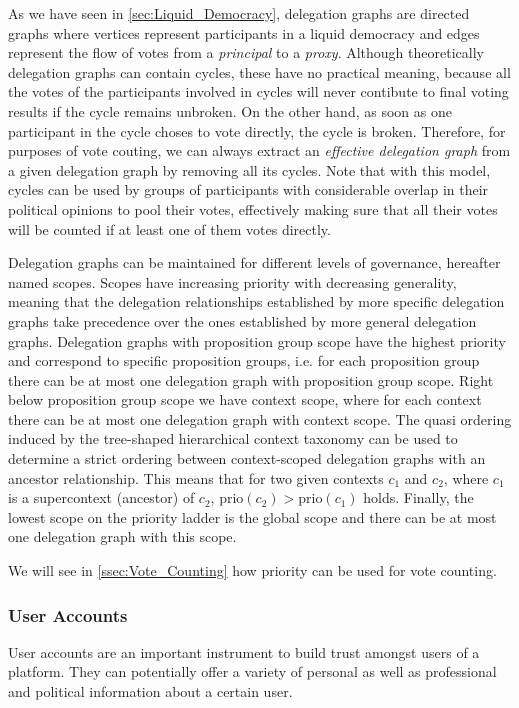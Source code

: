 As we have seen in \ref{sec:Liquid_Democracy}, delegation graphs are directed graphs where vertices represent participants in a liquid democracy and edges represent the flow of votes from a \textit{principal} to a \textit{proxy}.
Although theoretically delegation graphs can contain cycles, these have no practical meaning, because all the votes of the participants involved in cycles will never contibute to final voting results if the cycle remains unbroken.
On the other hand, as soon as one participant in the cycle choses to vote directly, the cycle is broken.
Therefore, for purposes of vote couting, we can always extract an \emph{effective delegation graph} from a given delegation graph by removing all its cycles.
Note that with this model, cycles can be used by groups of participants with considerable overlap in their political opinions to pool their votes, effectively making sure that all their votes will be counted if at least one of them votes directly.

Delegation graphs can be maintained for different levels of governance, hereafter named scopes.
Scopes have increasing priority with decreasing generality, meaning that the delegation relationships established by more specific delegation graphs take precedence over the ones established by more general delegation graphs.
Delegation graphs with proposition group scope have the highest priority and correspond to specific proposition groups, i.e. for each proposition group there can be at most one delegation graph with proposition group scope.
Right below proposition group scope we have context scope, where for each context there can be at most one delegation graph with context scope.
The quasi ordering induced by the tree-shaped hierarchical context taxonomy can be used to determine a strict ordering between context-scoped delegation graphs with an ancestor relationship.
This means that for two given contexts $c_1$ and $c_2$, where $c_1$ is a supercontext (ancestor) of $c_2$, $\text{prio}(c_2)>\text{prio}(c_1)$ holds.
Finally, the lowest scope on the priority ladder is the global scope and there can be at most one delegation graph with this scope. 

We will see in \autoref{ssec:Vote_Counting} how priority can be used for vote counting.

\subsubsection{User Accounts}
\label{ssec:User_Accounts}
User accounts are an important instrument to build trust amongst users of a  platform.
They can potentially offer a variety of personal as well as professional and political information about a certain user.


